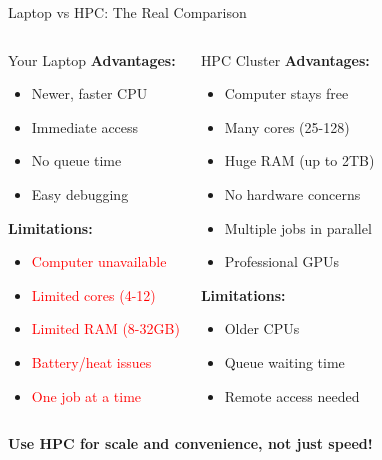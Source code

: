 \documentclass[aspectratio=169]{beamer}
\begin{document}
\begin{frame}{Laptop vs HPC: The Real Comparison}
\begin{columns}[T]
\begin{alertblock}{Your Laptop}
\textbf{Advantages:}
\begin{itemize}
    \item Newer, faster CPU
    \item Immediate access
    \item No queue time
    \item Easy debugging
\end{itemize}

\textbf{Limitations:}
\begin{itemize}
    \item \textcolor{red}{Computer unavailable}
    \item \textcolor{red}{Limited cores (4-12)}
    \item \textcolor{red}{Limited RAM (8-32GB)}
    \item \textcolor{red}{Battery/heat issues}
    \item \textcolor{red}{One job at a time}
\end{itemize}
\end{alertblock}

\begin{exampleblock}{HPC Cluster}
\textbf{Advantages:}
\begin{itemize}
    \item \textcolor{accentgreen}{Computer stays free}
    \item \textcolor{accentgreen}{Many cores (25-128)}
    \item \textcolor{accentgreen}{Huge RAM (up to 2TB)}
    \item \textcolor{accentgreen}{No hardware concerns}
    \item \textcolor{accentgreen}{Multiple jobs in parallel}
    \item \textcolor{accentgreen}{Professional GPUs}
\end{itemize}

\textbf{Limitations:}
\begin{itemize}
    \item Older CPUs
    \item Queue waiting time
    \item Remote access needed
\end{itemize}
\end{exampleblock}
\end{columns}

\vspace{0.5em}
\centering
\textcolor{ceciblue}{\textbf{Use HPC for scale and convenience, not just speed!}}
\end{frame}
\end{document}
